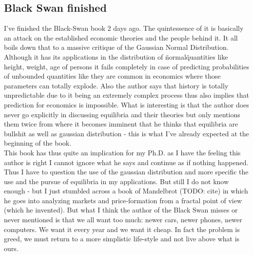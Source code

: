 \subsection*{Black Swan finished}
I've finished the Black-Swan book 2 days ago. The quintessence of it is basically an attack on the established economic theories and the people behind it. It all boils down that to a massive critique of the Gaussian Normal Distribution. Although it has its applications in the distribution of \"normal\" quantities like height, weight, age of persons it fails completely in case of predicting probabilities of unbounded quantities like they are common in economics where those parameters can totally explode. Also the author says that history is totally unpredictable due to it being an extremely complex process thus also implies that prediction for economics is impossible.  What is interesting is that the author does never go explicitly in discussing equilibria and their theories but only mentions them twice from where it becomes imminent that he thinks that equilibria are bullshit as well as gaussian distribution - this is what I've already expected at the beginning of the book. \\
This book has thus quite an implication for my Ph.D. as I have the feeling this author is right I cannot ignore what he says and continue as if nothing happened. Thus I have to question the use of the gaussian distribution and more specific the use and the pursue of equilibria in my applications. But still I do not know enough - but I just stumbled across a book of Mandelbrot (TODO: cite) in which he goes into analyzing markets and price-formation from a fractal point of view (which he invented). \bigskip
But what I think the author of the Black Swan misses or never mentioned is that we all want too much: newer cars, newer phones, newer computers. We want it every year and we want it cheap. In fact the problem is greed, we must return to a more simplistic life-style and not live above what is ours.

